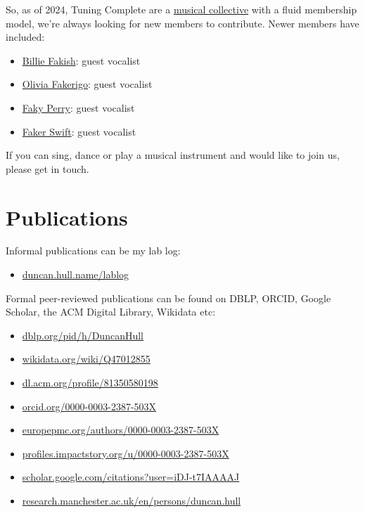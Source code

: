 \documentclass[
  12pt,
]{book}
\providecommand{\tightlist}{%
  \setlength{\itemsep}{0pt}\setlength{\parskip}{0pt}}
\begin{document}
So, as of 2024, Tuning Complete are a \href{https://en.wikipedia.org/wiki/Musical_collective}{musical collective} with a fluid membership model, we're always looking for new members to contribute. Newer members have included:

\begin{itemize}
\tightlist
\item
  \href{https://en.wikipedia.org/wiki/Billie_Eilish}{Billie Fakish}: guest vocalist \citep{badguy}
\item
  \href{https://en.wikipedia.org/wiki/Olivia_Rodrigo}{Olivia Fakerigo}: guest vocalist \citep{good4u}
\item
  \href{https://en.wikipedia.org/wiki/Katy_Perry}{Faky Perry}: guest vocalist \citep{roar}
\item
  \href{https://en.wikipedia.org/wiki/Taylor_Swift}{Faker Swift}: guest vocalist \citep{calmdown}
\end{itemize}

If you can sing, dance or play a musical instrument and would like to join us, please get in touch.

\hypertarget{publications}{%
\section{Publications}\label{publications}}

Informal publications can be my lab log:

\begin{itemize}
\tightlist
\item
  \href{https://duncan.hull.name/lablog/}{duncan.hull.name/lablog}
\end{itemize}

Formal peer-reviewed publications can be found on DBLP, ORCID, Google Scholar, the ACM Digital Library, Wikidata etc:

\begin{itemize}
\tightlist
\item
  \href{https://dblp.org/pid/h/DuncanHull}{dblp.org/pid/h/DuncanHull}
\item
  \href{https://www.wikidata.org/wiki/Q47012855}{wikidata.org/wiki/Q47012855}
\item
  \href{https://dl.acm.org/profile/81350580198}{dl.acm.org/profile/81350580198}
\item
  \href{https://orcid.org/0000-0003-2387-503X}{orcid.org/0000-0003-2387-503X}
\item
  \href{https://europepmc.org/authors/0000-0003-2387-503X}{europepmc.org/authors/0000-0003-2387-503X}
\item
  \href{https://profiles.impactstory.org/u/0000-0003-2387-503X}{profiles.impactstory.org/u/0000-0003-2387-503X}
\item
  \href{https://scholar.google.com/citations?user=iDJ-t7IAAAAJ}{scholar.google.com/citations?user=iDJ-t7IAAAAJ}
\item
  \href{https://research.manchester.ac.uk/en/persons/duncan.hull}{research.manchester.ac.uk/en/persons/duncan.hull}
\end{itemize}
\end{document}
